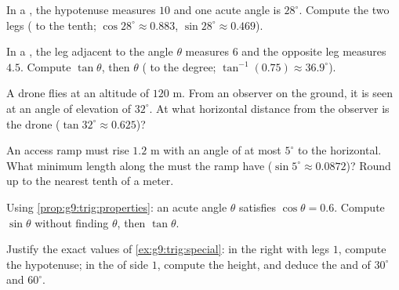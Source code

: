 \begin{exercise}[$\star$]\label{exo:g9:trig:4}
In a , the hypotenuse measures $10$ and one acute angle is
$28^\circ$. Compute the two legs ( to the tenth;
$\cos 28^\circ \approx 0.883$, $\sin 28^\circ \approx 0.469$).
\end{exercise}

\begin{exercise}[$\star$]\label{exo:g9:trig:5}
In a , the leg adjacent to the angle $\theta$ measures $6$
and the opposite leg measures $4.5$. Compute $\tan\theta$, then $\theta$
( to the degree; $\tan^{-1}(0.75) \approx 36.9^\circ$).
\end{exercise}

\begin{exercise}[$\star\star$]\label{exo:g9:trig:6}
A drone flies at an altitude of $120$ m. From an observer on the ground,
it is seen at an angle of elevation of $32^\circ$. At what horizontal
distance from the observer is the drone
($\tan 32^\circ \approx 0.625$)?
\end{exercise}

\begin{exercise}[$\star\star$]\label{exo:g9:trig:7}
An access ramp must rise $1.2$ m with an angle of at most $5^\circ$ to
the horizontal. What minimum length along the  must the ramp have
($\sin 5^\circ \approx 0.0872$)? Round up to the nearest tenth of a
meter.
\end{exercise}

\begin{exercise}[$\star\star$]\label{exo:g9:trig:8}
Using \cref{prop:g9:trig:properties}: an acute angle $\theta$ satisfies
$\cos\theta = 0.6$. Compute $\sin\theta$ without finding $\theta$, then
$\tan\theta$.
\end{exercise}

\begin{exercise}[$\star\star\star$]\label{exo:g9:trig:9}
Justify the exact values of \cref{ex:g9:trig:special}: in the right
 with legs $1$, compute the hypotenuse; in the
 of side $1$, compute the height, and deduce the
 and  of $30^\circ$ and $60^\circ$.
\end{exercise}

